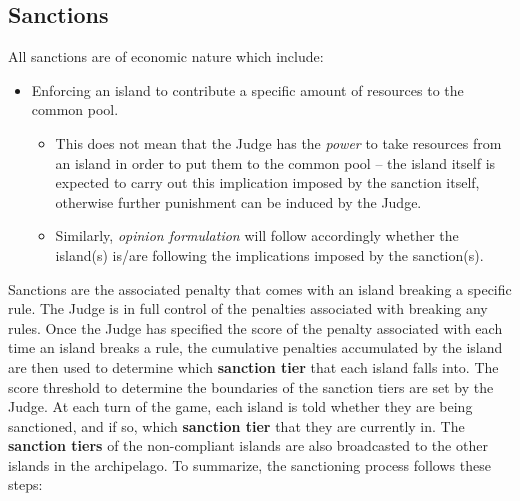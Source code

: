 \subsection{Sanctions}
\label{sec:sanctions}
All sanctions are of economic nature which include:
        \begin{itemize}
            \item Enforcing an island to contribute a specific amount of resources to the common pool.
            \begin{itemize}
                \item This does not mean that the Judge has the \emph{power} to take resources from an island in order to put them to the common pool -- the island itself is expected to carry out this implication imposed by the sanction itself, otherwise further punishment can be induced by the Judge.
                \item Similarly, \emph{opinion formulation} will follow accordingly whether the island(s) is/are following the implications imposed by the sanction(s).
            \end{itemize}

    \end{itemize}
    Sanctions are the associated penalty that comes with an island breaking a specific rule. The Judge is in full control of the penalties associated with breaking any rules. Once the Judge has specified the score of the penalty associated with each time an island breaks a rule, the cumulative penalties accumulated by the island are then used to determine which \textbf{sanction tier} that each island falls into. The score threshold to determine the boundaries of the sanction tiers are set by the Judge. At each turn of the game, each island is told whether they are being sanctioned, and if so, which \textbf{sanction tier} that they are currently in. The \textbf{sanction tiers} of the non-compliant islands are also broadcasted to the other islands in the archipelago. To summarize, the sanctioning process follows these steps:










